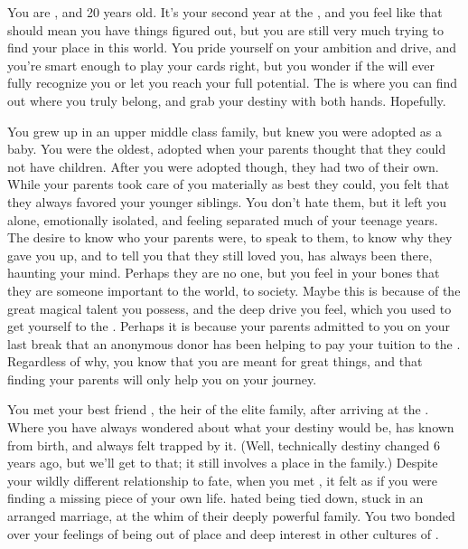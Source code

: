 \documentclass[char]{GL2020}
\begin{document}
\name{\cAmbition{}}

You are \cAmbition{\intro}, and 20 years old. It's your second year at the \pSchool{}, and you feel like that should mean you have things figured out, but you are still very much trying to find your place in this world. You pride yourself on your ambition and drive, and you're smart enough to play your cards right, but you wonder if the \pTechies{} will ever fully recognize you or let you reach your full potential. The \pSchool{} is where you can find out where you truly belong, and grab your destiny with both hands. Hopefully.  

You grew up in an upper middle class family,  but knew you were adopted as a baby.  You were the oldest, adopted when your parents thought that they could not have children.  After you were adopted though, they had two of their own.  While your parents took care of you materially as best they could, you felt that they always favored your younger siblings.  You don’t hate them, but it left you alone, emotionally isolated, and feeling separated much of your teenage years.  The desire to know who your parents were, to speak to them, to know why they gave you up,  and to tell you that they still loved you, has always been there, haunting your mind. Perhaps they are no one, but you feel in your bones that they are someone important to the world, to society. Maybe this is because of the great magical talent you possess, and the deep drive you feel, which you used to get yourself to the \pSchool{}.   Perhaps it is because your parents admitted to you on your last break that an anonymous donor has been helping to pay your tuition to the \pSc{}. Regardless of why, you know that you are meant for great things, and that finding your parents will only help you on your journey.  

You met your best friend \cHeir{\intro}, the heir of the elite \cHeir{\formal} family, after arriving at the \pSc{}. Where you have always wondered about what your destiny would be, \cHeir{} has known from birth, and always felt trapped by it. (Well, technically \cHeir{\their} destiny changed 6 years ago, but we’ll get to that; it still involves a place in the \cHeir{\formal} family.) Despite your wildly different relationship to fate, when you met \cHeir{\them}, it felt as if you were finding a missing piece of your own life. \cHeir{\They} hated being tied down, stuck in an arranged marriage, at the whim of their deeply powerful family. You two bonded over your feelings of being out of place and deep interest in other cultures of \pEarth{}. 
\end{document}
